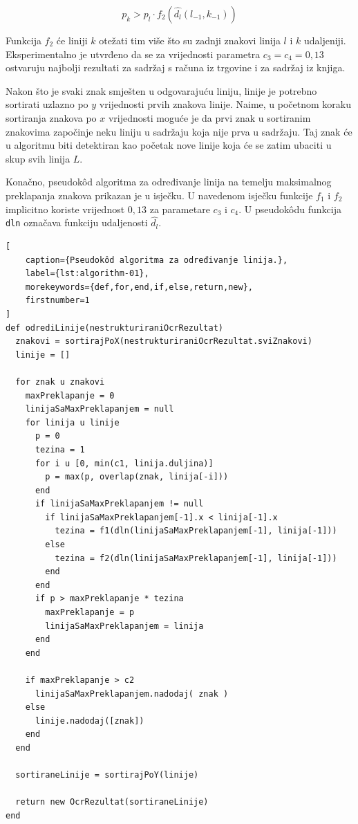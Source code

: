 \documentclass[times, utf8, zavrsni]{fer}
\begin{document}
\begin{equation}
    p_k > p_l \cdot f_2(\hat{d_l}(l_{-1},k_{-1}))
\end{equation}

Funkcija $f_2$ će liniji $k$ otežati tim više što su zadnji znakovi linija
$l$ i $k$ udaljeniji. Eksperimentalno je utvrđeno da se za vrijednosti parametra
$c_3 = c_4 = 0{,}13$ ostvaruju najbolji rezultati za sadržaj s računa iz
trgovine i za sadržaj iz knjiga.

Nakon što je svaki znak smješten u odgovarajuću liniju, linije je potrebno
sortirati uzlazno po $y$ vrijednosti prvih znakova linije. Naime, u početnom
koraku sortiranja znakova po $x$ vrijednosti moguće je da prvi znak
u sortiranim znakovima započinje neku liniju u sadržaju koja nije prva u sadržaju. Taj znak će u algoritmu biti detektiran kao početak nove linije koja će se zatim ubaciti u skup svih linija $L$.

Konačno, pseudokôd algoritma za određivanje linija na temelju maksimalnog
preklapanja znakova prikazan je u isječku. U navedenom isječku funkcije $f_1$ i
$f_2$ implicitno koriste vrijednost $0{,}13$ za parametare $c_3$ i $c_4$.
U pseudokôdu funkcija \lstinline{dln} označava funkciju udaljenosti $\hat{d_l}$.

\pagebreak

\begin{lstlisting}[
    caption={Pseudokôd algoritma za određivanje linija.},
    label={lst:algorithm-01},
    morekeywords={def,for,end,if,else,return,new},
    firstnumber=1
]
def odrediLinije(nestrukturiraniOcrRezultat)
  znakovi = sortirajPoX(nestrukturiraniOcrRezultat.sviZnakovi)
  linije = []

  for znak u znakovi
    maxPreklapanje = 0
    linijaSaMaxPreklapanjem = null
    for linija u linije
      p = 0
      tezina = 1
      for i u [0, min(c1, linija.duljina)]
        p = max(p, overlap(znak, linija[-i]))
      end
      if linijaSaMaxPreklapanjem != null
        if linijaSaMaxPreklapanjem[-1].x < linija[-1].x
          tezina = f1(dln(linijaSaMaxPreklapanjem[-1], linija[-1]))
        else
          tezina = f2(dln(linijaSaMaxPreklapanjem[-1], linija[-1]))
        end
      end
      if p > maxPreklapanje * tezina
        maxPreklapanje = p
        linijaSaMaxPreklapanjem = linija
      end
    end

    if maxPreklapanje > c2
      linijaSaMaxPreklapanjem.nadodaj( znak )
    else
      linije.nadodaj([znak])
    end
  end

  sortiraneLinije = sortirajPoY(linije)

  return new OcrRezultat(sortiraneLinije)
end
\end{lstlisting}
\end{document}
